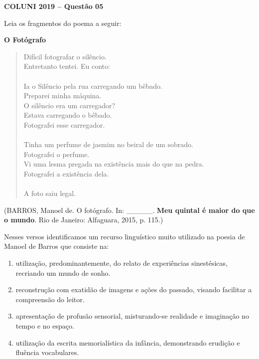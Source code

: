 \textbf{COLUNI 2019 -- Questão 05}\par\medskip Leia os fragmentos do poema a seguir:

\par

\textbf{O Fotógrafo}

\par

\begin{verse}
Difícil fotografar o silêncio.\\
Entretanto tentei. Eu conto:\\
[...]\\
Ia o Silêncio pela rua carregando um bêbado.\\
Preparei minha máquina.\\
O silêncio era um carregador?\\
Estava carregando o bêbado.\\
Fotografei esse carregador.\\
[...]\\
Tinha um perfume de jasmim no beiral de um sobrado.\\
Fotografei o perfume.\\
Vi uma lesma pregada na existência mais do que na pedra.\\
Fotografei a existência dela.\\
[...]\\
A foto saiu legal.
\end{verse}
(BARROS, Manoel de. O fotógrafo. In: \_\_\_\_\_. \textbf{Meu quintal é maior do que o mundo}. Rio de Janeiro: Alfaguara, 2015, p. 115.)

\par

Nesses versos identificamos um recurso linguístico muito utilizado na poesia de Manoel de Barros que consiste na:\begin{enumerate}
\item utilização, predominantemente, do relato de experiências sinestésicas, recriando um mundo de sonho.
\item reconstrução com exatidão de imagens e ações do passado, visando facilitar a compreensão do leitor.
\item apresentação de profusão sensorial, misturando-se realidade e imaginação no tempo e no espaço.
\item utilização da escrita memorialística da infância, demonstrando erudição e fluência vocabulares.\end{enumerate}
